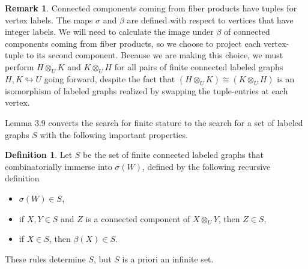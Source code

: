 \documentclass[11pt,hyp,]{nyjm}
\theoremstyle{definition}
\newtheorem{definition}[theorem]{Definition}
\newtheorem*{remark}{Remark}
\begin{document}
\begin{remark}
Connected components coming from fiber products have tuples for vertex labels. The maps $\sigma$ and $\beta$ are defined with respect to vertices that have integer labels. We will need to calculate the image under $\beta$ of connected components coming from fiber products, so we choose to project each vertex-tuple to its second component. Because we are making this choice, we must perform $H\otimes_{U}K$ and $K\otimes_{U}H$ for all pairs of finite connected labeled graphs $H,K\looparrowright U$ going forward, despite the fact that $(H\otimes_{U}K)\cong(K\otimes_{U}H)$ is an isomorphism of labeled graphs realized by swapping the tuple-entries at each vertex.
\end{remark}

Lemma 3.9 converts the search for finite stature to the search for a set of labeled graphs $S$ with the following important properties.

\begin{definition}
    Let $S$ be the set of finite connected labeled graphs that combinatorially immerse into $\sigma(W)$, defined by the following recursive definition\begin{itemize}
        \item $\sigma(W)\in S$,
        \item if $X,Y\in S$ and $Z$ is a connected component of $X\otimes_UY$, then $Z\in S$,
        \item if $X\in S$, then $\beta(X)\in S$.
    \end{itemize}
    These rules determine $S$, but $S$ is a priori an infinite set.
\end{definition}
\end{document}
